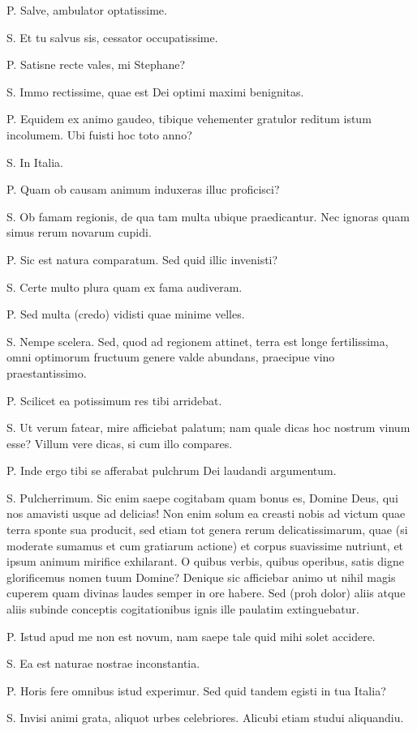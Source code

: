 \documentclass{article}
\begin{document}
P. Salve, ambulator optatissime.

S. Et tu salvus sis, cessator occupatissime.

P. Satisne recte vales, mi Stephane?

S. Immo rectissime, quae est Dei optimi maximi benignitas.

P. Equidem ex animo gaudeo, tibique vehementer gratulor reditum istum incolumem. Ubi fuisti hoc toto anno?

S. In Italia.

P. Quam ob causam animum induxeras illuc proficisci?

S. Ob famam regionis, de qua tam multa ubique praedicantur. Nec ignoras quam simus rerum novarum cupidi.

P. Sic est natura comparatum. Sed quid illic invenisti?

S. Certe multo plura quam ex fama audiveram.

P. Sed multa (credo) vidisti quae minime velles.

 
S. Nempe scelera. Sed, quod ad regionem attinet, terra est longe fertilissima, omni optimorum fructuum genere valde abundans, praecipue vino praestantissimo.

P. Scilicet ea potissimum res tibi arridebat.

S. Ut verum fatear, mire afficiebat palatum; nam quale dicas hoc nostrum vinum esse? Villum vere dicas, si cum illo compares.

P. Inde ergo tibi se afferabat pulchrum Dei laudandi argumentum.

S. Pulcherrimum. Sic enim saepe cogitabam quam bonus es, Domine Deus, qui nos amavisti usque ad delicias! Non enim solum ea creasti nobis ad victum quae terra sponte sua producit, sed etiam tot genera rerum delicatissimarum, quae (si moderate sumamus et cum gratiarum actione) et corpus suavissime nutriunt, et ipsum animum mirifice exhilarant. O quibus verbis, quibus operibus, satis digne glorificemus nomen tuum Domine? Denique sic afficiebar animo ut nihil magis cuperem quam divinas laudes semper in ore habere. Sed (proh dolor) aliis atque aliis subinde conceptis cogitationibus ignis ille paulatim extinguebatur.

P. Istud apud me non est novum, nam saepe tale quid mihi solet accidere.

S. Ea est naturae nostrae inconstantia.

P. Horis fere omnibus istud experimur. Sed quid tandem egisti in tua Italia?

S. Invisi animi grata, aliquot urbes celebriores. Alicubi etiam studui aliquandiu.
\end{document}
